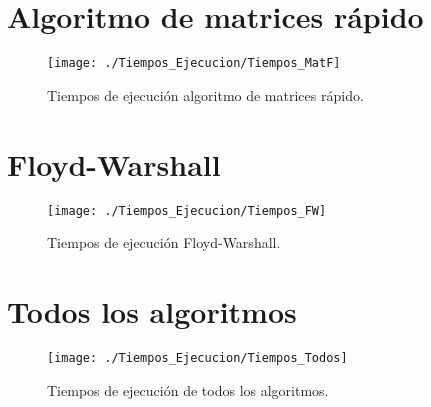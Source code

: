 \newpage

\section{Algoritmo de matrices rápido}

\begin{figure}[!htb]
	\centering
	\texttt{[image: ./Tiempos\_Ejecucion/Tiempos\_MatF]}
	
	\caption{Tiempos de ejecución algoritmo de matrices rápido.}
	\label{fig:tiempos_MatF}
\end{figure}

\section{Floyd-Warshall}

\begin{figure}[!htb]
	\centering
	\texttt{[image: ./Tiempos\_Ejecucion/Tiempos\_FW]}
	
	\caption{Tiempos de ejecución Floyd-Warshall.}
	\label{fig:tiempos_FW}
\end{figure}

\newpage

\section{Todos los algoritmos}

\begin{figure}[!htb]
	\centering
	\texttt{[image: ./Tiempos\_Ejecucion/Tiempos\_Todos]}
	
	\caption{Tiempos de ejecución de todos los algoritmos.}
	\label{fig:tiempos_Todos}
\end{figure}


\endinput
